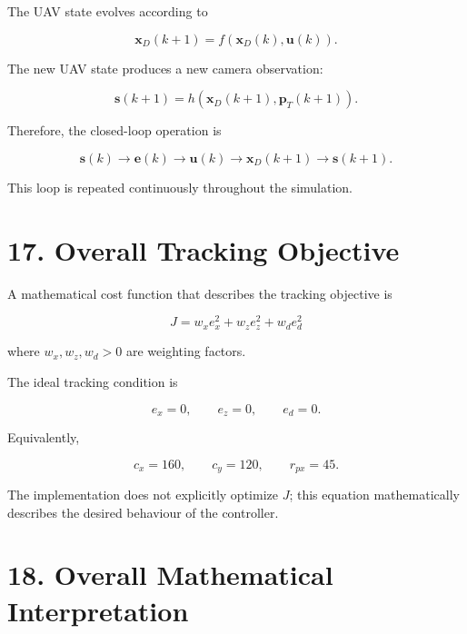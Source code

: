 \documentclass[12pt,a4paper]{article}
\begin{document}
The UAV state evolves according to

\begin{equation}
\mathbf{x}_D(k+1)
=
f\left(
\mathbf{x}_D(k),
\mathbf{u}(k)
\right).
\end{equation}

The new UAV state produces a new camera observation:

\begin{equation}
\mathbf{s}(k+1)
=
h\left(
\mathbf{x}_D(k+1),
\mathbf{p}_T(k+1)
\right).
\end{equation}

Therefore, the closed-loop operation is

\begin{equation}
\boxed{
\mathbf{s}(k)
\rightarrow
\mathbf{e}(k)
\rightarrow
\mathbf{u}(k)
\rightarrow
\mathbf{x}_D(k+1)
\rightarrow
\mathbf{s}(k+1).
}
\end{equation}

This loop is repeated continuously throughout the simulation.

\section{17. Overall Tracking Objective}

A mathematical cost function that describes the tracking objective is

\begin{equation}
\boxed{
J=w_xe_x^2+w_ze_z^2+w_de_d^2
}
\end{equation}

where $w_x,w_z,w_d>0$ are weighting factors.

The ideal tracking condition is

\begin{equation}
e_x=0,\qquad
e_z=0,\qquad
e_d=0.
\end{equation}

Equivalently,

\begin{equation}
\boxed{
c_x=160,\qquad
c_y=120,\qquad
r_{px}=45.
}
\end{equation}

The implementation does not explicitly optimize $J$; this equation mathematically describes the desired behaviour of the controller.

\section{18. Overall Mathematical Interpretation}
\end{document}
